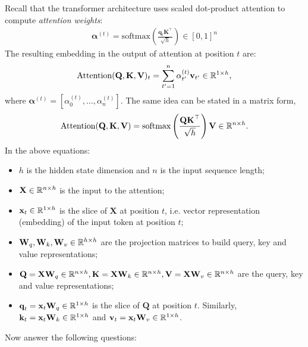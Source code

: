 Recall that the transformer architecture uses scaled dot-product attention to compute \textit{attention weights}:
\begin{align*}
    \boldsymbol{\alpha}^{(t)}  =  \text{softmax} \left( \frac{\textbf{q}_t \textbf{K}^\top }  {\sqrt{h}} \right) \in [0, 1]^n 
\end{align*}
The resulting embedding in the output of attention at position $t$ are: 
$$\text{Attention}(\textbf{Q}, \textbf{K}, \textbf{V})_t = \sum_{t'=1}^n  \alpha^{(t)}_{t'} \textbf{v}_{t'} \in \mathbb{R}^{1 \times h},$$ 
where $\boldsymbol{\alpha}^{(t)} = [\alpha^{(t)}_{0}, \hdots, \alpha^{(t)}_{n}]$.
The same idea can be stated in a matrix form, 
$$
    \text{Attention}(\textbf{Q}, \textbf{K}, \textbf{V}) = \text{softmax} \left( \frac{\textbf{Q} \textbf{K}^\top}{\sqrt{h}} \right) \textbf{V} \in \mathbb{R}^{n \times h}.
$$
In the above equations: 
\begin{itemize}
    \item $h$ is the hidden state dimension and $n$ is the input sequence length; 
    \item $\textbf{X} \in \mathbb{R}^{n\times h}$ is the input to the attention; 
    \item $\textbf{x}_t \in \mathbb{R}^{1 \times h}$ is the slice of $\textbf{X}$ at position $t$, i.e. vector representation (embedding) of the input token at position $t$; 
    \item $\textbf{W}_q, \textbf{W}_k, \textbf{W}_v \in \mathbb{R}^{h\times h}$ are the projection matrices to build query, key and value representations; 
    \item $\textbf{Q} = \textbf{X} \textbf{W}_q \in \mathbb{R}^{n \times h}, 
    \textbf{K} = \textbf{X} \textbf{W}_k \in \mathbb{R}^{n \times h}, 
    \textbf{V} = \textbf{X} \textbf{W}_v \in \mathbb{R}^{n \times h}$ are the query, key and value representations; 
    \item $\textbf{q}_t = \textbf{x}_t\textbf{W}_q \in \mathbb{R}^{1 \times h}$ is the slice of $\textbf{Q}$ at position $t$. 
    Similarly, $\textbf{k}_t = \textbf{x}_t\textbf{W}_k \in \mathbb{R}^{1 \times h}$ and 
    $\textbf{v}_t = \textbf{x}_t\textbf{W}_v \in \mathbb{R}^{1 \times h}$. 
\end{itemize}
Now answer the following questions: 


